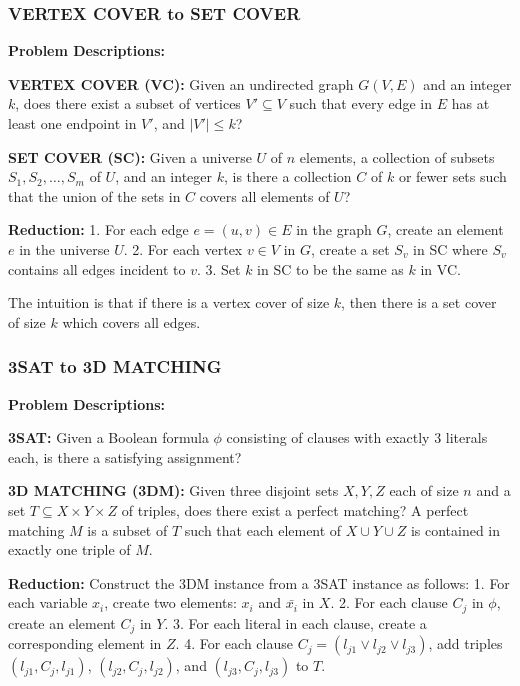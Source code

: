 \subsubsection{VERTEX COVER to SET COVER}
\textbf{Problem Descriptions:}

\textbf{VERTEX COVER (VC):} Given an undirected graph \(G(V, E)\) and an integer \(k\), does there exist a subset of vertices \(V' \subseteq V\) such that every edge in \(E\) has at least one endpoint in \(V'\), and \(|V'|\leq k\)?

\textbf{SET COVER (SC):} Given a universe \(U\) of \(n\) elements, a collection of subsets \(S_1, S_2, \ldots, S_m\) of \(U\), and an integer \(k\), is there a collection \(C\) of \(k\) or fewer sets such that the union of the sets in \(C\) covers all elements of \(U\)?

\textbf{Reduction:} 
1. For each edge \(e = (u, v) \in E\) in the graph \(G\), create an element \(e\) in the universe \(U\).
2. For each vertex \(v \in V\) in \(G\), create a set \(S_v\) in SC where \(S_v\) contains all edges incident to \(v\).
3. Set \(k\) in SC to be the same as \(k\) in VC.

The intuition is that if there is a vertex cover of size \(k\), then there is a set cover of size \(k\) which covers all edges.

\subsubsection{3SAT to 3D MATCHING}
\textbf{Problem Descriptions:}

\textbf{3SAT:} Given a Boolean formula \( \phi \) consisting of clauses with exactly 3 literals each, is there a satisfying assignment?

\textbf{3D MATCHING (3DM):} Given three disjoint sets \(X, Y, Z\) each of size \(n\) and a set \(T \subseteq X \times Y \times Z\) of triples, does there exist a perfect matching? A perfect matching \(M\) is a subset of \(T\) such that each element of \(X \cup Y \cup Z\) is contained in exactly one triple of \(M\).

\textbf{Reduction:}
Construct the 3DM instance from a 3SAT instance as follows:
1. For each variable \(x_i\), create two elements: \(x_i\) and \( \bar{x_i}\) in \(X\).
2. For each clause \(C_j\) in \( \phi \), create an element \(C_j\) in \(Y\).
3. For each literal in each clause, create a corresponding element in \(Z\).
4. For each clause \(C_j = (l_{j1} \lor l_{j2} \lor l_{j3})\), add triples \((l_{j1}, C_j, l_{j1})\), \((l_{j2}, C_j, l_{j2})\), and \((l_{j3}, C_j, l_{j3})\) to \(T\).

